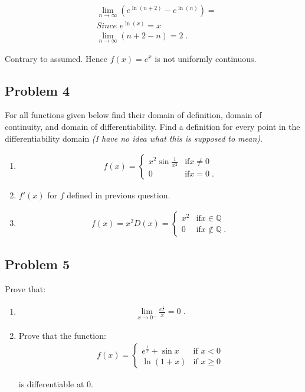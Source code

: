 \documentclass[a4paper]{article}
\begin{document}
\begin{align*}
  &\lim_{n \to \infty}\left(e^{\ln(n + 2)} - e^{\ln(n)}\right) = \\
  &\textit{Since $e^{\ln(x)} = x$} \\
  &\lim_{n \to \infty}\left(n + 2 - n\right) = 2\;.
\end{align*}

Contrary to assumed.  Hence \(f(x) = e^x\) is not uniformly continuous.

\subsection{Problem 4}
\label{sec:orgheadline11}
For all functions given below find their domain of definition, domain of
continuity, and domain of differentiability.  Find a definition for every
point in the differentiability domain \emph{(I have no idea what this is supposed
to mean)}.
\begin{enumerate}
\item \begin{align*}
  f(x) = \begin{cases}
    x^2 \sin \frac{1}{x^2} &\mbox{if} x \neq 0 \\
    0                      &\mbox{if} x = 0\;.
  \end{cases}
\end{align*}

\item \(f'(x)\) for \(f\) defined in previous question.
\item \begin{align*}
  f(x) = x^2D(x) = \begin{cases}
    x^2 &\mbox{if} x \in \mathbb{Q} \\
    0   &\mbox{if} x \not \in \mathbb{Q}\;.
  \end{cases}
\end{align*}
\end{enumerate}

\subsection{Problem 5}
\label{sec:orgheadline14}
Prove that:
\begin{enumerate}
\item \begin{align*}
  \lim_{x \to 0^-}\frac{e^{\frac{1}{x}}}{x} = 0\;.
\end{align*}

\item Prove that the function:
\begin{align*}
  f(x) = \begin{cases}
    e^{\frac{1}{x}} + \sin x &\mbox{if } x < 0 \\
    \ln(1 + x)             &\mbox{if } x \geq 0
  \end{cases}
\end{align*}

is differentiable at 0.
\end{enumerate}
\end{document}
